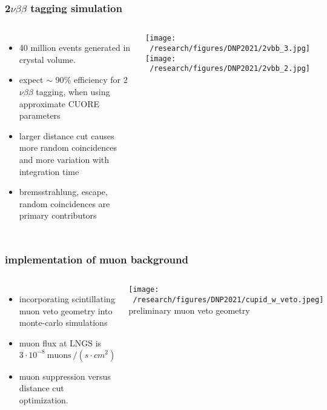 \documentclass{beamer}
\begin{document}
	\begin{frame}
		\frametitle{2$\nu\beta\beta$ tagging simulation}
		\begin{columns}[c] %
			
			\begin{itemize}
				\setlength\itemsep{2em}
				\item 40 million events generated in crystal volume.
				\item expect $\sim$ 90$\%$ efficiency for 2$\nu\beta\beta$ tagging, when using approximate CUORE parameters
				\item larger distance cut causes more random coincidences and more variation with integration time
				\item bremsstrahlung, escape, random coincidences are primary contributors
			\end{itemize}
			
			\hspace*{0.5cm}\texttt{[image: ~/research/figures/DNP2021/2vbb\_3.jpg]}
			\medskip
			\hspace*{0.5cm}\texttt{[image: ~/research/figures/DNP2021/2vbb\_2.jpg]}
			
		\end{columns}
	\end{frame}


	\begin{frame}
		\frametitle{implementation of muon background}
		\begin{columns}[c] %
			
			\begin{itemize}
				\setlength\itemsep{2em}
				\item incorporating scintillating muon veto geometry into monte-carlo simulations
				\item muon flux at LNGS is $3\cdot 10^{-8} \ \text{muons} \ / \left(s\cdot cm^2\right)$
				\item muon suppression versus distance cut optimization.
			\end{itemize}
			
			\texttt{[image: ~/research/figures/DNP2021/cupid\_w\_veto.jpeg]}
			{\footnotesize preliminary muon veto geometry}

			
		\end{columns}
	\end{frame}
\end{document}
